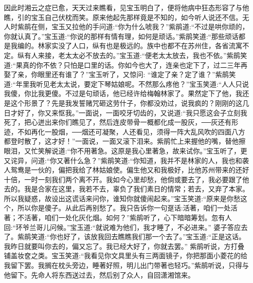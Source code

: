 \begin{parag}
    因此时湘云之症已愈，天天过来瞧看，见宝玉明白了，便将他病中狂态形容了与他瞧，引的宝玉自己伏枕而笑。原来他起先那样竟是不知的，如今听人说还不信。无人时紫鹃在侧，宝玉又拉他的手问道:“你为什么唬我？”紫鹃道:“不过是哄你顽的，你就认真了。”宝玉道:“你说的那样有情有理，如何是顽话。”紫鹃笑道:“那些顽话都是我编的。林家实没了人口，纵有也是极远的。族中也都不在苏州住，各省流寓不定。纵有人来接，老太太必不放去的。”宝玉道:“便老太太放去，我也不依。”紫鹃笑道:“果真的你不依？只怕是口里的话。你如今也大了，连亲也定下了，过二三年再娶了亲，你眼里还有谁了？”宝玉听了，又惊问: “谁定了亲？定了谁？”紫鹃笑道:“年里我听见老太太说，要定下琴姑娘呢。不然那么疼他？”宝玉笑道:“人人只说我傻，你比我更傻。不过是句顽话，他已经许给梅翰林家了。果然定下了他，我还是这个形景了？先是我发誓赌咒砸这劳什子，你都没劝过，说我疯的？刚刚的这几日才好了，你又来怄我。”一面说，一面咬牙切齿的，又说道:“我只愿这会子立刻我死了，把心迸出来你们瞧见了，然后连皮带骨一概都化成一股灰，──灰还有形迹，不如再化一股烟，──烟还可凝聚，人还看见，须得一阵大乱风吹的四面八方都登时散了，这才好！”一面说，一面又滚下泪来。紫鹃忙上来握他的嘴，替他擦眼泪，又忙笑解说道:“你不用著急。这原是我心里著急，故来试你。”宝玉听了，更又诧异，问道:“你又著什么急？”紫鹃笑道:“你知道，我并不是林家的人，我也和袭人鸳鸯是一伙的，偏把我给了林姑娘使。偏生他又和我极好，比他苏州带来的还好十倍，一时一刻我们两个离不开。我如今心里却愁，他倘或要去了，我必要跟了他去的。我是合家在这里，我若不去，辜负了我们素日的情常；若去，又弃了本家。所以我疑惑，故设出这谎话来问你，谁知你就傻闹起来。”宝玉笑道:“原来是你愁这个，所以你是傻子。从此后再别愁了。我只告诉你一句趸话:活著，咱们一处活著；不活著，咱们一处化灰化烟。如何？”紫鹃听了，心下暗暗筹划。忽有人回:“环爷兰哥儿问候。”宝玉道:“就说难为他们，我才睡了，不必进来。” 婆子答应去了。紫鹃笑道:“你也好了，该放我回去瞧瞧我们那一个去了。”宝玉道:“正是这话。我昨日就要叫你去的，偏又忘了。我已经大好了，你就去罢。” 紫鹃听说，方打叠铺盖妆奁之类。宝玉笑道:“我看见你文具里头有三两面镜子，你把那面小菱花的给我留下罢。我搁在枕头旁边，睡著好照，明儿出门带著也轻巧。”紫鹃听说，只得与他留下。先命人将东西送过去，然后别了众人，自回潇湘馆来。
\end{parag}


